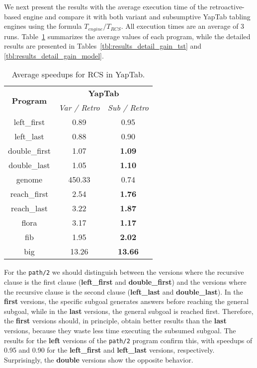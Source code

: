 We next present the results with the average execution time of the retroactive-based
engine and compare it with both variant and subsumptive YapTab tabling engines using the formula $T_{engine} / T_{RCS}$.
All execution times are an average of 3 runs. Table~\ref{tbl:results_gain_overview} summarizes the average values of
each program, while the detailed results are presented in Tables~\ref{tbl:results_detail_gain_tst} and
\ref{tbl:results_detail_gain_model}.

\begin{table}[ht]
\centering
  \begin{tabular}{ccc}
   \hline
    \hline
    \multirow{2}{*}{\textbf{Program}} & \multicolumn{2}{c}{\textbf{YapTab}} \\
    & \textit{\small{Var / Retro}} & \textit{\small{Sub / Retro}} \\
   \hline
   \hline
left\_first & 0.89 & 0.95 \\
left\_last & 0.88  & 0.90 \\
double\_first & 1.07 & \textbf{1.09} \\
double\_last & 1.05 & \textbf{1.10} \\
genome & 450.33 & 0.74 \\
reach\_first  & 2.54 & \textbf{1.76} \\
reach\_last  & 3.22 & \textbf{1.87} \\
flora & 3.17 & \textbf{1.17} \\
fib & 1.95 & \textbf{2.02} \\
big & 13.26 & \textbf{13.66} \\
\hline
\hline
\end{tabular}
\caption{Average speedups for RCS in YapTab.}
\label{tbl:results_gain_overview}
\end{table}

For the \texttt{path/2} we should distinguish between the versions where the recursive clause is the first
clause (\textbf{left\_first} and \textbf{double\_first}) and the versions where the recursive clause is the second
clause (\textbf{left\_last} and \textbf{double\_last}). In the \textbf{first} versions, the specific subgoal
generates answers before reaching the general subgoal, while in the \textbf{last} versions, the general subgoal
is reached first. Therefore, the \textbf{first} versions should, in principle, obtain better results than the \textbf{last}
versions, because they waste less time executing the subsumed subgoal. The results for the \textbf{left} versions of the
\texttt{path/2} program confirm this, with speedups of 0.95 and 0.90 for the \textbf{left\_first} and
\textbf{left\_last} versions, respectively. Surprisingly, the \textbf{double} versions show the opposite behavior.


